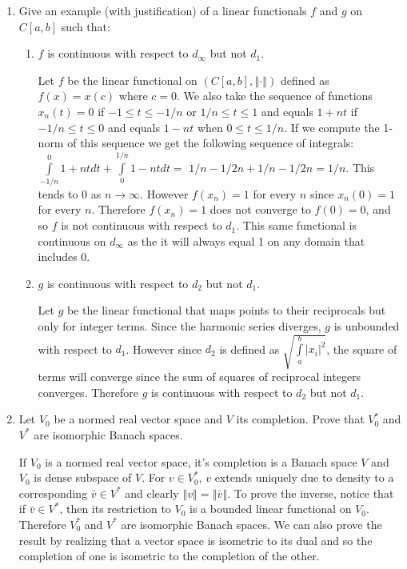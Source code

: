 \documentclass[12pt,letterpaper,reqno]{amsart}
\newcommand{\Norm}[1]{\left\Vert #1 \right \Vert}
\begin{document}
\begin{enumerate}[1.]
\item Give an example (with justification) of a linear functionals $f$ and $g$ on $C[a,b]$ such that:
\begin{enumerate}
\item $f$ is continuous with respect to $d_\infty$ but not $d_1$.
\begin{flushleft}
Let $f$ be the linear functional on $(C[a,b], \Norm{\cdot})$ defined as $f(x) = x(c)$ where $c = 0$. We also take the sequence of functions $x_n(t) = 0$ if $-1 \leq t \leq -1/n$ or $1/n \leq t \leq 1$ and equals $1 + nt$ if $-1/n \leq t \leq 0$ and equals $1-nt$ when $0 \leq t \leq 1/n$. If we compute the 1-norm of this sequence we get the following sequence of integrals: $\int\limits_{-1/n}^0 1+nt dt + \int\limits_0^{1/n} 1 -nt dt =$ $1/n - 1/2n + 1/n - 1/2n = 1/n$. This tends to 0 as $n \rightarrow \infty$. However $f(x_n) = 1$ for every $n$ since $x_n(0) = 1$ for every $n$. Therefore $f(x_n) = 1$ does not converge to $f(0) = 0$, and so $f$ is not continuous with respect to $d_1$. This same functional is continuous on $d_\infty$ as the it will always equal 1 on any domain that includes 0.
\end{flushleft}
\item $g$ is continuous with respect to $d_2$ but not $d_1$.
\begin{flushleft}
Let $g$ be the linear functional that maps points to their reciprocals but only for integer terms. Since the harmonic series diverges, $g$ is unbounded with respect to $d_1$. However since $d_2$ is defined as $\sqrt{\int\limits_a^b |x_i|^2}$, the square of terms will converge since the sum of squares of reciprocal integers converges. Therefore $g$ is continuous with respect to $d_2$ but not $d_1$.
\end{flushleft}
\end{enumerate}
\item Let $V_0$ be a normed real vector space and $V$ its completion. Prove that $V_0^*$ and $V^*$ are  isomorphic  Banach spaces.
\begin{flushleft}
If $V_0$ is a normed real vector space, it's completion is a Banach space $V$ and $V_0$ is dense subspace of $V$. For $v \in V_0^*$, $v$ extends uniquely due to density to a corresponding $\bar{v} \in V^*$ and clearly $\Norm{v} = \Norm{\bar{v}}$. To prove the inverse, notice that if $\bar{v} \in V^*$, then its restriction  to $V_0$ is a bounded linear functional on $V_0$. Therefore $V_0^*$ and $V^*$ are  isomorphic  Banach spaces. We can also prove the result by realizing that a vector space is isometric to its dual and so the completion of one is isometric to the completion of the other.
\end{flushleft}
\end{enumerate}
\end{document}

